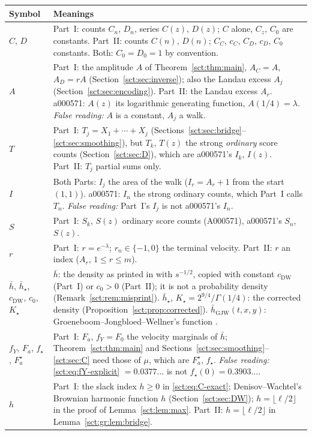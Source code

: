 \documentclass[11pt,letterpaper]{article}
\theoremstyle{definition}\newtheorem{remark}[theorem]{Remark}
\newcommand{\fY}{f_Y}\newcommand{\code}[1]{\texttt{#1}}
\newcommand{\hstar}{\bar h_\star}\newcommand{\fstar}{f_\star}\newcommand{\Kstar}{K_\star}
\begin{document}
\begin{longtable}{@{}>{\raggedright\arraybackslash}p{} >{\raggedright\arraybackslash}p{}@{}}
\toprule
Symbol & Meanings\\
\midrule
\endhead
$C$, $D$ & Part~I: counts $C_n$, $D_n$, series $C(z)$, $D(z)$; $C$ alone, $C_z$, $C_0$ are constants. Part~II: counts $C(n)$, $D(n)$; $C_C$, $c_C$, $C_D$, $c_D$, $C_0$ constants. Both: $C_0=D_0=1$ by convention.\\
$A$ & Part~I: the amplitude $A$ of Theorem~\ref{sct:thm:main}, $A_C=A$, $A_D=rA$ (Section~\ref{sct:sec:inverse}); also the Landau excess $A_j$ (Section~\ref{sct:sec:encoding}). Part~II: the Landau excess $A_r$. a000571: $A(z)$ its logarithmic generating function, $A(1/4)=\lambda$. \emph{False reading:} $A$ is a constant, $A_j$ a walk.\\
$T$ & Part~I: $T_j=X_1+\cdots+X_j$ (Sections~\ref{sct:sec:bridge}--\ref{sct:sec:smoothing}), but $T_k$, $T(z)$ the strong \emph{ordinary} score counts (Section~\ref{sct:sec:D}), which are a000571's $I_k$, $I(z)$. Part~II: $T_j$ partial sums only.\\
$I$ & Both Parts: $I_j$ the area of the walk ($I_r=A_r+1$ from the start $(1,1)$). a000571: $I_n$ the strong ordinary counts, which Part~I calls $T_n$. \emph{False reading:} Part~I's $I_j$ is not a000571's $I_n$.\\
$S$ & Part~I: $S_k$, $S(z)$ ordinary score counts (A000571), a000571's $S_n$, $S(z)$.\\
$r$ & Part~I: $r=e^{-\lambda}$; $r_n\in\{-1,0\}$ the terminal velocity. Part~II: $r$ an index ($A_r$, $1\le r\le m$).\\
$\bar h$, $\hstar$, $c_{\mathrm{DW}}$, $c_0$, $\Kstar$ & $\bar h$: the density as printed in \cite[Theorem~1]{dw} with $s^{-1/2}$, copied with constant $c_{\mathrm{DW}}$ (Part~I) or $c_0>0$ (Part~II); it is not a probability density (Remark~\ref{sct:rem:misprint}). $\hstar$, $\Kstar=2^{9/4}/\Gamma(1/4)$: the corrected density (Proposition~\ref{sct:prop:corrected}). $\bar h_{\mathrm{GJW}}(t,x,y)$: Groeneboom--Jongbloed--Wellner's function \cite[(2.24)]{gjw}.\\
$\fY$, $F_a$, $\fstar$, $F^\star_a$ & Part~I: $F_a$, $\fY=F_0$ the velocity marginals of $\bar h$; Theorem~\ref{sct:thm:main} and Sections~\ref{sct:sec:smoothing}--\ref{sct:sec:C} need those of $\mu$, which are $F^\star_a$, $\fstar$. \emph{False reading:} \eqref{sct:eq:fY-explicit} $=0.0377\ldots$ is not $\fstar(0)=0.3903\ldots$.\\
$h$ & Part~I: the slack index $h\ge0$ in \eqref{sct:eq:C-exact}; Denisov--Wachtel's Brownian harmonic function $h$ (Section~\ref{sct:sec:DW}); $h=\lfloor\ell/2\rfloor$ in the proof of Lemma~\ref{sct:lem:max}. Part~II: $h=\lfloor\ell/2\rfloor$ in Lemma~\ref{sct:gr:lem:bridge}.\\

\end{longtable}
\end{document}
